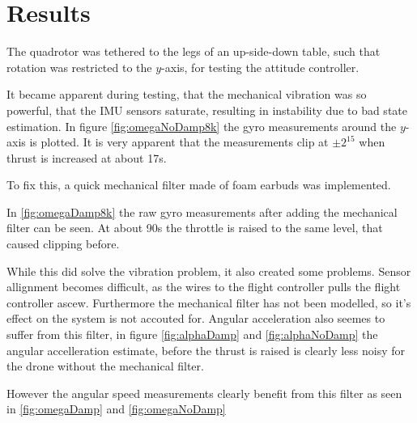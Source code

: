 \section{ Results } %

The quadrotor was tethered to the legs of an up-side-down table, such that rotation
was restricted to the $y$-axis, for testing the attitude controller.

It became apparent during testing, that the mechanical vibration was so
powerful, that the IMU sensors saturate, resulting in instability due to bad
state estimation. In figure \ref{fig:omegaNoDamp8k} the gyro measurements
around the $y$-axis is plotted. It is very apparent that the measurements clip
at $\pm2^15$ when thrust is increased at about 17s.


To fix this, a quick mechanical filter made of foam earbuds was implemented.

In \ref{fig:omegaDamp8k} the raw gyro measurements after adding the mechanical filter
can be seen. At about 90s the throttle is raised to the same level, that caused
clipping before.


While this did solve the vibration problem, it also created some problems.
Sensor allignment becomes difficult, as the wires to the flight controller pulls the
flight controller ascew. Furthermore the mechanical filter has not been
modelled, so it's effect on the system is not accouted for.
Angular acceleration also seemes to suffer from this filter, in figure
\ref{fig:alphaDamp} and \ref{fig:alphaNoDamp} the angular accelleration
estimate, before the thrust is raised is clearly less noisy for the drone
without the mechanical filter.


However the angular speed measurements clearly benefit from this filter as seen
in \ref{fig:omegaDamp} and \ref{fig:omegaNoDamp}


